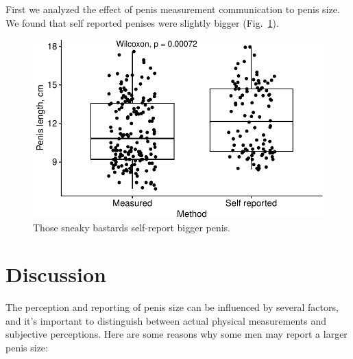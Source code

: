 \documentclass[
  10pt,
  letterpaper,
]{article}
\begin{document}
First we analyzed the effect of penis measurement communication to penis
size. We found that self reported penises were slightly bigger
(Fig.~\ref{fig-psize}).

\begin{figure}

{\centering \includegraphics{penis-paper_files/figure-pdf/fig-psize-1.pdf}

}

\caption{\label{fig-psize}Those sneaky bastards self-report bigger
penis.}

\end{figure}

\hypertarget{discussion}{%
\section{Discussion}\label{discussion}}

The perception and reporting of penis size can be influenced by several
factors, and it's important to distinguish between actual physical
measurements and subjective perceptions. Here are some reasons why some
men may report a larger penis size:
\end{document}
